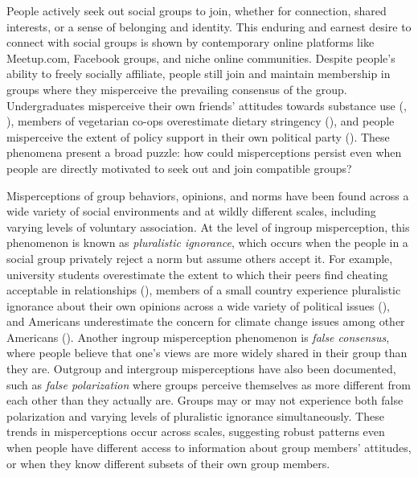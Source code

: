 People actively seek out social groups to join, whether for connection, shared interests, or a sense of belonging and identity. This enduring and earnest desire to connect with social groups is shown by contemporary online platforms like Meetup.com, Facebook groups, and niche online communities. 
Despite people's ability to freely socially affiliate, people still join and maintain membership in groups where they misperceive the prevailing consensus of the group. 
Undergraduates misperceive their own friends' attitudes towards substance use (\cite{prentice_pluralistic_1993}, \cite{amialchuk_influence_2019}), 
members of vegetarian co-ops overestimate dietary stringency (\cite{kitts_egocentric_2003}), 
and people misperceive the extent of policy support in their own political party (\cite{ahler_parties_2018}). 
These phenomena present a broad puzzle: how could misperceptions persist even when people are directly motivated to seek out and join compatible groups?

Misperceptions of group behaviors, opinions, and norms have been found across a wide variety of social environments and at wildly different scales, including varying levels of voluntary association. 
At the level of ingroup misperception, this phenomenon is known as \emph{pluralistic ignorance}, which occurs when the people in a social group privately reject a norm but assume others accept it. For example, university students overestimate the extent to which their peers find cheating acceptable in relationships (\cite{boon_pluralistic_2014}), 
members of a small country experience pluralistic ignorance about their own opinions across a wide variety of political issues (\cite{shamir_pluralistic_1997}), and Americans underestimate the concern for climate change issues among other Americans (\cite{sparkman_americans_2022}). Another ingroup misperception phenomenon is \emph{false consensus}, where people believe that one's views are more widely shared in their group than they are. 
Outgroup and intergroup misperceptions have also been documented, such as \emph{false polarization} 
where groups perceive themselves as more different from each other than they actually are. Groups may or may not experience both false polarization and varying levels of pluralistic ignorance simultaneously. 
These trends in misperceptions occur across scales, suggesting robust patterns even when people have different access to information about group members' attitudes, or when they know different subsets of their own group members.

